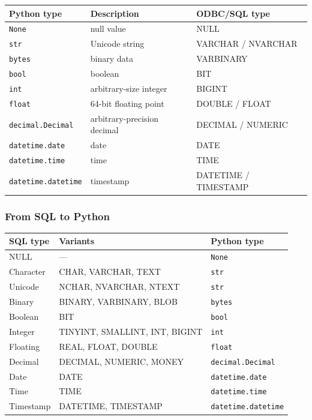 {
\scriptsize
\begin{center}
\begin{tabular}{@{}lll@{}}
\toprule
\textbf{Python type} & \textbf{Description} & \textbf{ODBC/SQL type} \\
\midrule
\texttt{None} & null value & NULL \\
\texttt{str} & Unicode string & VARCHAR / NVARCHAR \\
\texttt{bytes} & binary data & VARBINARY \\
\texttt{bool} & boolean & BIT \\
\texttt{int} & arbitrary-size integer & BIGINT \\
\texttt{float} & 64-bit floating point & DOUBLE / FLOAT \\
\texttt{decimal.Decimal} & arbitrary-precision decimal & DECIMAL / NUMERIC \\
\texttt{datetime.date} & date & DATE \\
\texttt{datetime.time} & time & TIME \\
\texttt{datetime.datetime} & timestamp & DATETIME / TIMESTAMP \\
\bottomrule
\end{tabular}
\end{center}
}

\subsubsection{From SQL to Python}
\label{subsec:sql-to-python}

{
\scriptsize
\begin{center}
\begin{tabular}{@{}lll@{}}
\toprule
\textbf{SQL type} & \textbf{Variants} & \textbf{Python type} \\
\midrule
NULL & --- & \texttt{None} \\
Character & CHAR, VARCHAR, TEXT & \texttt{str} \\
Unicode & NCHAR, NVARCHAR, NTEXT & \texttt{str} \\
Binary & BINARY, VARBINARY, BLOB & \texttt{bytes} \\
Boolean & BIT & \texttt{bool} \\
Integer & TINYINT, SMALLINT, INT, BIGINT & \texttt{int} \\
Floating & REAL, FLOAT, DOUBLE & \texttt{float} \\
Decimal & DECIMAL, NUMERIC, MONEY & \texttt{decimal.Decimal} \\
Date & DATE & \texttt{datetime.date} \\
Time & TIME & \texttt{datetime.time} \\
Timestamp & DATETIME, TIMESTAMP & \texttt{datetime.datetime} \\
\bottomrule
\end{tabular}
\end{center}
}

